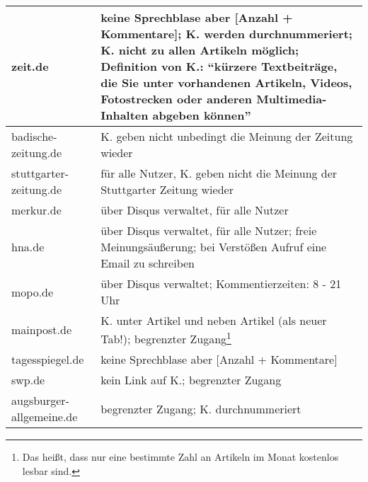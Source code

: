 \begin{longtable}{lp{10cm}}
zeit.de &
  keine Sprechblase aber [Anzahl + Kommentare]; K. werden durchnummeriert;  K.
  nicht zu allen Artikeln möglich; Definition von K.: ``kürzere Textbeiträge,
  die Sie unter vorhandenen Artikeln, Videos, Fotostrecken oder anderen
  Multimedia-Inhalten abgeben können'' \\\midrule

badische-zeitung.de & K. geben nicht unbedingt die Meinung der Zeitung wieder
  \\\midrule

stuttgarter-zeitung.de &
  für alle Nutzer, K. geben nicht die Meinung der Stuttgarter Zeitung
  wieder\\\midrule

merkur.de &
  über Disqus verwaltet, für alle Nutzer\\\midrule

hna.de &
  über Disqus verwaltet, für alle Nutzer; freie Meinungsäußerung; bei Verstößen
  Aufruf eine Email zu schreiben \\\midrule

mopo.de &
  über Disqus verwaltet; Kommentierzeiten: 8 - 21 Uhr\\\midrule

mainpost.de &
  K. unter Artikel und neben Artikel (als neuer Tab!); begrenzter
  Zugang\footnote{Das heißt, dass nur eine bestimmte Zahl an Artikeln im Monat
  kostenlos lesbar sind.}\\\midrule

tagesspiegel.de &
  keine Sprechblase aber [Anzahl + Kommentare]\\\midrule

swp.de &
  kein Link auf K.; begrenzter Zugang\\\midrule

augsburger-allgemeine.de &
  begrenzter Zugang; K. durchnummeriert
\end{longtable}
\endgroup

